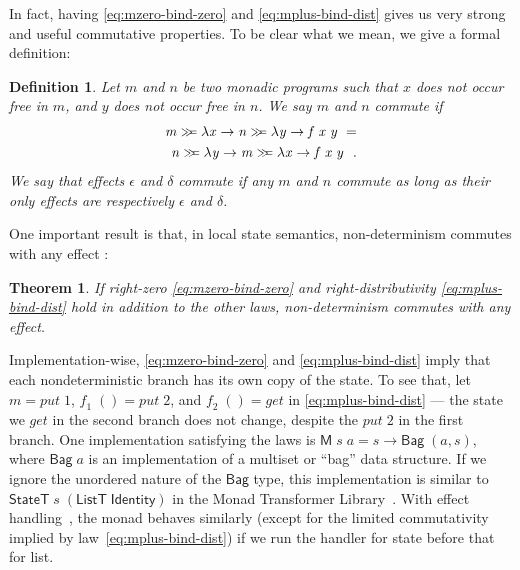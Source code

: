 \documentclass{jfp}
\newcommand{\Conid}[1]{\mathit{#1}}
\newcommand{\Varid}[1]{\mathit{#1}}
\let\Varid\mathit
\let\Conid\mathsf
\newtheorem{theorem}{Theorem}
\newtheorem{definition}{Definition}
\begin{document}
In fact, having \eqref{eq:mzero-bind-zero} and \eqref{eq:mplus-bind-dist} gives us very strong and useful commutative properties.
To be clear what we mean, we give a formal definition:
\begin{definition}
Let \ensuremath{\Varid{m}} and \ensuremath{\Varid{n}} be two monadic programs such that \ensuremath{\Varid{x}} does not occur free in \ensuremath{\Varid{m}}, and \ensuremath{\Varid{y}} does not occur free in \ensuremath{\Varid{n}}. We say \ensuremath{\Varid{m}} and \ensuremath{\Varid{n}} commute if
\begin{equation} \label{eq:commute}
\begin{split}
  \ensuremath{\Varid{m}\mathrel{\hstretch{0.7}{>\!\!>\!\!=}}\lambda \Varid{x}\to \Varid{n}\mathrel{\hstretch{0.7}{>\!\!>\!\!=}}\lambda \Varid{y}\to \Varid{f}\;\Varid{x}\;\Varid{y}~\mathrel{=}}\\
   \ensuremath{\Varid{n}\mathrel{\hstretch{0.7}{>\!\!>\!\!=}}\lambda \Varid{y}\to \Varid{m}\mathrel{\hstretch{0.7}{>\!\!>\!\!=}}\lambda \Varid{x}\to \Varid{f}\;\Varid{x}\;\Varid{y}~~.}
\end{split}
\end{equation}
We say that effects \ensuremath{\epsilon} and \ensuremath{\delta} commute if any \ensuremath{\Varid{m}} and \ensuremath{\Varid{n}} commute as long as their only effects are respectively \ensuremath{\epsilon} and \ensuremath{\delta}.
\end{definition}
One important result is that, in local state semantics, non-determinism commutes with any effect :
\begin{theorem} \label{thm:nondet-commute}
If right-zero \eqref{eq:mzero-bind-zero} and right-distributivity \eqref{eq:mplus-bind-dist} hold
in addition to the other laws, non-determinism commutes with any effect.
\end{theorem}

Implementation-wise, \eqref{eq:mzero-bind-zero} and \eqref{eq:mplus-bind-dist} imply that each nondeterministic branch has its own copy of the state.
To see that, let \ensuremath{\Varid{m}\mathrel{=}\Varid{put}\;\mathrm{1}}, \ensuremath{\Varid{f}_{1}\;()\mathrel{=}\Varid{put}\;\mathrm{2}}, and \ensuremath{\Varid{f}_{2}\;()\mathrel{=}\Varid{get}} in \eqref{eq:mplus-bind-dist} --- the state we \ensuremath{\Varid{get}} in the second branch does not change, despite the \ensuremath{\Varid{put}\;\mathrm{2}} in the first branch.
One implementation satisfying the laws is \ensuremath{\Conid{M}\;\Varid{s}\;\Varid{a}\mathrel{=}\Varid{s}\to \Conid{Bag}\;(\Varid{a},\Varid{s})}, where
\ensuremath{\Conid{Bag}\;\Varid{a}} is an implementation of a multiset or ``bag'' data structure.
If we ignore the unordered nature of the \ensuremath{\Conid{Bag}} type, this implementation is
similar to \ensuremath{\Conid{StateT}\;\Varid{s}\;(\Conid{ListT}\;\Conid{Identity})} in the Monad Transformer
Library~\cite{MTL:14}. With effect
handling~\cite{Wu:14:Effect,KiselyovIshii:15:Freer}, the monad behaves similarly
(except for the limited commutativity implied by
law~\eqref{eq:mplus-bind-dist}) if we run the handler for state before that for
list.
\end{document}
